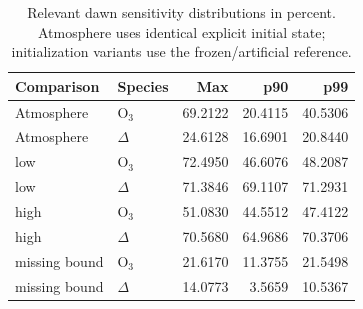 \begin{table}[htbp]\centering\small\caption{Relevant dawn sensitivity distributions in percent. Atmosphere uses identical explicit initial state; initialization variants use the frozen/artificial reference.}\label{tab:allsensitivity}\begin{tabular}{llrrr}\toprule Comparison & Species & Max & p90 & p99\\\midrule
Atmosphere & O$_3$ & 69.2122 & 20.4115 & 40.5306\\
Atmosphere & $\Delta$ & 24.6128 & 16.6901 & 20.8440\\
low & O$_3$ & 72.4950 & 46.6076 & 48.2087\\
low & $\Delta$ & 71.3846 & 69.1107 & 71.2931\\
high & O$_3$ & 51.0830 & 44.5512 & 47.4122\\
high & $\Delta$ & 70.5680 & 64.9686 & 70.3706\\
missing bound & O$_3$ & 21.6170 & 11.3755 & 21.5498\\
missing bound & $\Delta$ & 14.0773 & 3.5659 & 10.5367\\\bottomrule\end{tabular}\end{table}
